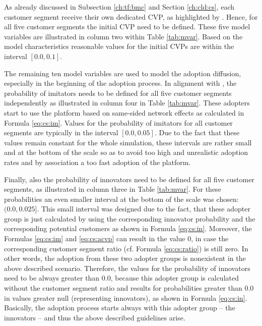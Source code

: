 \setlength{\tabcolsep}{\originalTabcolsep}

As already discussed in Subsection \ref{ch:tf:bmc} and Section \ref{ch:cld:cs}, each customer segment receive their own dedicated \ac{CVP}, as highlighted by \citet{Johnson2008}. Hence, for all five customer segments the initial \ac{CVP} need to be defined. These five model variables are illustrated in column two within Table \ref{tab:mvar}. Based on the model characteristics reasonable values for the initial \acp{CVP} are within the interval $[0.0,0.1]$.

The remaining ten model variables are used to model the adoption diffusion, especially in the beginning of the adoption process. In alignment with \citet[p. 19]{Sterman2001}, the probability of imitators needs to be defined for all five customer segments independently as illustrated in column four in Table \ref{tab:mvar}. These adopters start to use the platform based on same-sided network effects as calculated in Formula \ref{eq:cs:im}. Values for the probability of imitators for all customer segments are typically in the interval $[0.0, 0.05]$. Due to the fact that these values remain constant for the whole simulation, these intervals are rather small and at the bottom of the scale so as to avoid too high and unrealistic adoption rates and by association a too fast adoption of the platform.

Finally, also the probability of innovators need to be defined for all five customer segments, as illustrated in column three in Table \ref{tab:mvar}. For these probabilities an even smaller interval at the bottom of the scale was chosen: $(0.0,0.025]$. This small interval was designed due to the fact, that these adopter group is just calculated by using the corresponding innovator probability and the corresponding potential customers as shown in Formula \ref{eq:cs:in}. Moreover, the Formulas \ref{eq:cs:im} and \ref{eq:cs:acvp} can result in the value $0$, in case the corresponding customer segment ratio (cf. Formula \ref{eq:cs:ratio}) is still zero. In other words, the adoption from these two adopter groups is nonexistent in the above described scenario. Therefore, the values for the probability of innovators need to be always greater than $0.0$, because this adopter group is calculated without the customer segment ratio and results for probabilities greater than $0.0$ in values greater null (representing innovators), as shown in Formula \ref{eq:cs:in}. Basically, the adoption process starts always with this adopter group -- the innovators -- and thus the above described guidelines arise.


